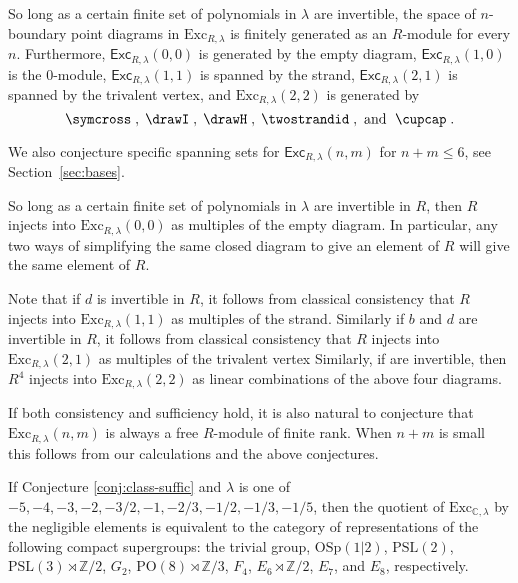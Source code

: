 \documentclass[12pt]{amsart}
\begin{document}
\begin{conjecture}
  \label{conj:class-suffic}
So long as a certain finite set of polynomials in $\lambda$ are
invertible, the space of $n$-boundary point diagrams in
$\mathrm{Exc}_{R,\lambda}$ is finitely generated as an $R$-module for
every $n$.  Furthermore, $\mathsf{Exc}_{R,\lambda}(0,0)$ is generated
by the empty diagram, $\mathsf{Exc}_{R,\lambda}(1,0)$ is the
$0$-module, $\mathsf{Exc}_{R,\lambda}(1,1)$ is spanned by the strand,
$\mathsf{Exc}_{R,\lambda}(2,1)$ is spanned by the trivalent vertex,
and $\mathrm{Exc}_{R,\lambda}(2,2)$ is generated by
$$\symcross\;, \; \drawI \;, \; \drawH \;, \; \twostrandid \;, \text{ and } \; \cupcap \; .$$
\end{conjecture}

We also conjecture specific spanning sets for $\mathsf{Exc}_{R,\lambda}(n,m)$ for $n+m \leq 6$, see Section~\ref{sec:bases}.

\begin{conjecture}
  \label{conj:class-consist}
So long as a certain finite set of polynomials in $\lambda$ are invertible in $R$, then $R$ injects into $\mathrm{Exc}_{R,\lambda}(0,0)$ as multiples of the empty diagram.  In particular, any two ways of simplifying the same closed diagram to give an element of $R$ will give the same element of $R$.
\end{conjecture}

Note that if $d$ is invertible in $R$, it follows from classical consistency that $R$ injects into $\mathrm{Exc}_{R,\lambda}(1,1)$ as multiples of the strand.  Similarly if $b$ and $d$ are invertible in $R$, it follows from classical consistency that $R$ injects into $\mathrm{Exc}_{R,\lambda}(2,1)$ as multiples of the trivalent vertex  Similarly, if  are invertible, then $R^4$ injects into $\mathrm{Exc}_{R,\lambda}(2,2)$ as linear combinations of the above four diagrams.


If both consistency and sufficiency hold, it is also natural to conjecture that $\mathrm{Exc}_{R,\lambda}(n,m)$ is always a free $R$-module of finite rank.  When $n+m$ is small this follows from our calculations and the above conjectures.

\begin{corollary}
If Conjecture \ref{conj:class-suffic} and
$\lambda$ is one of $-5, -4, -3, -2, -3/2,-1,-2/3,-1/2,-1/3,-1/5$, then the quotient of $\mathrm{Exc}_{\mathbb{C},\lambda}$ by the negligible elements is equivalent to the category of representations of the following compact supergroups: the trivial group, $\mathrm{OSp}(1 | 2)$, $\mathrm{PSL}(2)$, $\mathrm{PSL}(3) \rtimes \mathbb{Z}/2$, $G_2$, $\mathrm{PO}(8) \rtimes \mathbb{Z}/3$, $F_4$, $E_6 \rtimes \mathbb{Z}/2$, $E_7$, and $E_8$, respectively.
\end{corollary}
\end{document}
